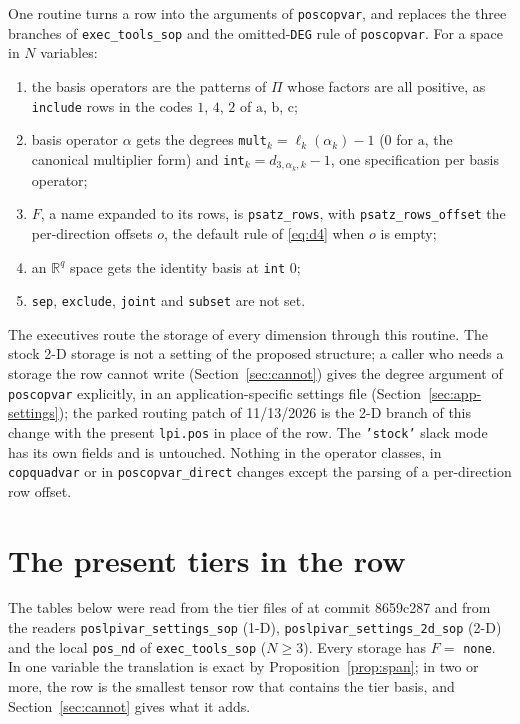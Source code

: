 \documentclass[12pt]{article}
\newcommand{\R}{\mathbb{R}}
\newcommand{\code}[1]{\texttt{#1}}
\newcommand{\file}[1]{\path{#1}}      %
\newcommand{\ba}{\mathrm{a}}
\newcommand{\bb}{\mathrm{b}}
\newcommand{\bc}{\mathrm{c}}
\theoremstyle{plain}
\theoremstyle{definition}
\theoremstyle{remark}
\begin{document}
One routine turns a row into the arguments of \code{poscopvar}, and replaces the three branches of \code{exec\_tools\_sop} and the omitted-\code{DEG} rule of \code{poscopvar}. For a space in $N$ variables:
\begin{enumerate}\setlength\itemsep{0pt}
\item the basis operators are the patterns of $\Pi$ whose factors are all positive, as \code{include} rows in the codes $1$, $4$, $2$ of $\ba$, $\bb$, $\bc$;
\item basis operator $\alpha$ gets the degrees \code{mult}$_k=\ell_k(\alpha_k)-1$ ($0$ for $\ba$, the canonical multiplier form) and \code{int}$_k=d_{3,\alpha_k,k}-1$, one specification per basis operator;
\item $F$, a name expanded to its rows, is \code{psatz\_rows}, with \code{psatz\_rows\_offset} the per-direction offsets $o$, the default rule of \eqref{eq:d4} when $o$ is empty;
\item an $\R^q$ space gets the identity basis at \code{int} $0$;
\item \code{sep}, \code{exclude}, \code{joint} and \code{subset} are not set.
\end{enumerate}
The executives route the storage of every dimension through this routine. The stock 2-D storage is not a setting of the proposed structure; a caller who needs a storage the row cannot write (Section~\ref{sec:cannot}) gives the degree argument of \code{poscopvar} explicitly, in an application-specific settings file (Section~\ref{sec:app-settings}); the parked routing patch of 11/13/2026 is the 2-D branch of this change with the present \code{lpi.pos} in place of the row. The \code{'stock'} slack mode has its own fields and is untouched. Nothing in the operator classes, in \code{copquadvar} or in \code{poscopvar\_direct} changes except the parsing of a per-direction row offset.

\section{The present tiers in the row}\label{sec:tiers}

The tables below were read from the tier files \file{settings_sopvar_*.m} of \file{settings_sopvar/} at commit 8659c287 and from the readers \code{poslpivar\_settings\_sop} (1-D), \code{poslpivar\_settings\_2d\_sop} (2-D) and the local \code{pos\_nd} of \code{exec\_tools\_sop} ($N\ge3$). Every storage has $F=$ \code{none}. In one variable the translation is exact by Proposition~\ref{prop:span}; in two or more, the row is the smallest tensor row that contains the tier basis, and Section~\ref{sec:cannot} gives what it adds.
\end{document}

